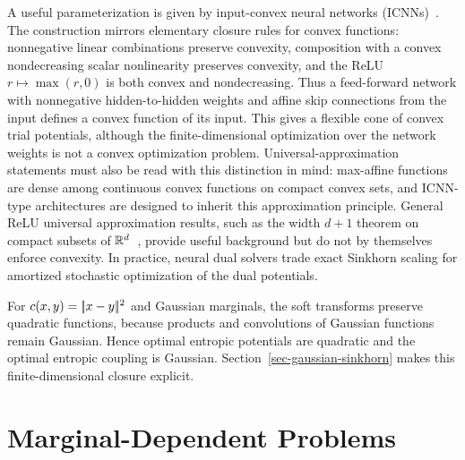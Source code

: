 A useful parameterization is given by input-convex neural networks (ICNNs)~\cite{amos2017input,makkuva2020optimal}. The construction mirrors elementary closure rules for convex functions: nonnegative linear combinations preserve convexity, composition with a convex nondecreasing scalar nonlinearity preserves convexity, and the ReLU \(r\mapsto\max(r,0)\) is both convex and nondecreasing. Thus a feed-forward network with nonnegative hidden-to-hidden weights and affine skip connections from the input defines a convex function of its input. This gives a flexible cone of convex trial potentials, although the finite-dimensional optimization over the network weights is not a convex optimization problem. Universal-approximation statements must also be read with this distinction in mind: max-affine functions are dense among continuous convex functions on compact convex sets, and ICNN-type architectures are designed to inherit this approximation principle. General ReLU universal approximation results, such as the width \(d+1\) theorem on compact subsets of \(\mathbb{R}^d\)~\cite{hanin2019universal}, provide useful background but do not by themselves enforce convexity. In practice, neural dual solvers trade exact Sinkhorn scaling for amortized stochastic optimization of the dual potentials.

\begin{rem}\label{rem-sinkhorn-gaussian-marginals}
	For $c(x,y)=|\!| x-y |\!|^2$ and Gaussian marginals, the soft transforms preserve quadratic functions, because products and convolutions of Gaussian functions remain Gaussian. Hence optimal entropic potentials are quadratic and the optimal entropic coupling is Gaussian. Section~\ref{sec-gaussian-sinkhorn} makes this finite-dimensional closure explicit.
\end{rem}




\section{Marginal-Dependent Problems}
\label{sec-sinkhorn-marginal-dependent}

